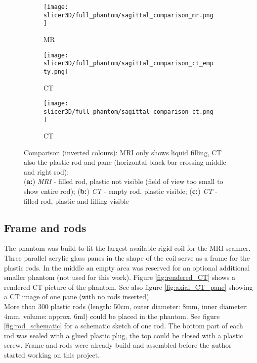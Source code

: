 \begin{figure}[!htb]
\centering
  \begin{subfigure}[b]{0.1\textwidth}
    \texttt{[image: slicer3D/full\_phantom/sagittal\_comparison\_mr.png]}
    \caption{MR}
    \label{fig:sagittal_comparison_mr}
  \end{subfigure}
  \begin{subfigure}[b]{0.1\textwidth}
    \texttt{[image: slicer3D/full\_phantom/sagittal\_comparison\_ct\_empty.png]}
    \caption{CT}
    \label{fig:sagittal_comparison_ct_empty}
  \end{subfigure}
  \begin{subfigure}[b]{0.1\textwidth}
    \texttt{[image: slicer3D/full\_phantom/sagittal\_comparison\_ct.png]}
    \caption{CT}
    \label{fig:sagittal_comparison_ct}
  \end{subfigure}
  \caption{Comparison (inverted colours): MRI only shows liquid filling, CT also the plastic rod and pane (horizontal black bar crossing middle and right rod);\\ (\textbf{a:}) \textit{MRI} - filled rod, plastic not visible (field of view too small to show entire rod); (\textbf{b:}) \textit{CT} - empty rod, plastic visible; (\textbf{c:}) \textit{CT} - filled rod, plastic and filling visible}
  \label{fig:sagittal_comparison}
\end{figure}

\subsection{Frame and rods}

The phantom was build to fit the largest available rigid coil for the MRI scanner.
Three parallel acrylic glass panes in the shape of the coil serve as a frame for the plastic rods.
In the middle an empty area was reserved for an optional additional smaller phantom (not used for this work).
Figure \ref{fig:rendered_CT} shows a rendered CT picture of the phantom. See also figure \ref{fig:axial_CT_pane} showing a CT image of one pane (with no rods inserted). \\
More than 300 plastic rods (length: 50cm, outer diameter: 8mm, inner diameter: 4mm, volume: approx. 6ml) could be placed in the phantom.
See figure \ref{fig:rod_schematic} for a schematic sketch of one rod.
The bottom part of each rod was sealed with a glued plastic plug, the top could be closed with a plastic screw.
Frame and rods were already build and assembled before the author started working on this project.

